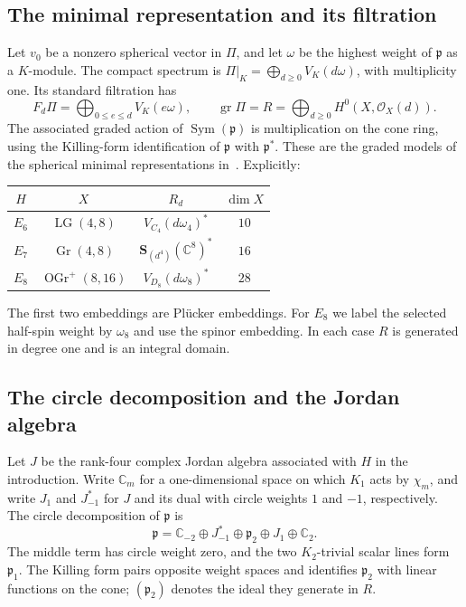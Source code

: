 \documentclass[11pt]{article}
\newcommand{\C}{\mathbb C}
\newcommand{\OO}{\mathcal O}
\newcommand{\Gr}{\operatorname{Gr}}
\newcommand{\LG}{\operatorname{LG}}
\newcommand{\OGr}{\operatorname{OGr}}
\newcommand{\Sym}{\operatorname{Sym}}
\newcommand{\gr}{\operatorname{gr}}
\newcommand{\fp}{\mathfrak p}
\newcommand{\bS}{\mathbf S}
\theoremstyle{definition}
\numberwithin{equation}{section}
\begin{document}
\subsection{The minimal representation and its filtration}
Let $v_0$ be a nonzero spherical vector in $\Pi$, and let $\omega$ be
the highest weight of $\fp$ as a $K$-module. The compact spectrum is
$\Pi|_K=\bigoplus_{d\geq0}V_K(d\omega)$, with multiplicity one.
Its standard filtration has
\[
 F_d\Pi=\bigoplus_{0\leq e\leq d}V_K(e\omega),\qquad
 \gr\Pi=R=\bigoplus_{d\geq0}H^0(X,\OO_X(d)).
\]
The associated graded action of $\Sym(\fp)$ is multiplication on the cone ring,
using the Killing-form identification of $\fp$ with $\fp^*$.
These are the graded models of the spherical minimal representations
in~\cite{BK}. Explicitly:
\begin{center}
\begin{tabular}{c c c c}
\toprule
$H$ & $X$ & $R_d$ & $\dim X$ \\
\midrule
$E_6$ & $\LG(4,8)$ & $V_{C_4}(d\omega_4)^*$ & $10$ \\
$E_7$ & $\Gr(4,8)$ & $\bS_{(d^4)}(\C^8)^*$ & $16$ \\
$E_8$ & $\OGr^+(8,16)$ & $V_{D_8}(d\omega_8)^*$ & $28$ \\
\bottomrule
\end{tabular}
\end{center}
The first two embeddings are Pl\"ucker embeddings. For $E_8$ we label
the selected half-spin weight by $\omega_8$ and use the spinor embedding.
In each case $R$ is generated in degree one and is an integral domain.

\subsection{The circle decomposition and the Jordan algebra}
Let $J$ be the rank-four complex Jordan algebra associated with $H$
in the introduction. Write $\C_m$ for a one-dimensional space on which
$K_1$ acts by $\chi_m$, and write $J_1$ and $J^*_{-1}$ for $J$ and
its dual with circle weights $1$ and $-1$, respectively.
The circle decomposition of $\fp$ is
\begin{equation}\label{eq:degreeone}
 \fp=\C_{-2}\oplus J^*_{-1}\oplus\fp_2\oplus J_1\oplus\C_2.
\end{equation}
The middle term has circle weight zero, and the two $K_2$-trivial
scalar lines form $\fp_1$. The Killing form pairs opposite weight
spaces and identifies $\fp_2$ with linear functions on the cone;
$(\fp_2)$ denotes the ideal they generate in $R$.
\end{document}
